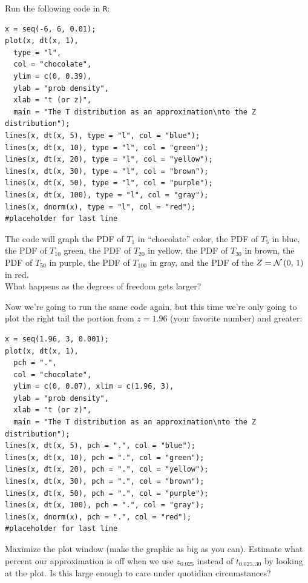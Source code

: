 \documentclass[12pt]{article}
\begin{document}
\benum
\easysubproblem Run the following code in \texttt{R}:

\footnotesize
\begin{verbatim}
x = seq(-6, 6, 0.01);
plot(x, dt(x, 1), 
  type = "l", 
  col = "chocolate", 
  ylim = c(0, 0.39), 
  ylab = "prob density", 
  xlab = "t (or z)", 
  main = "The T distribution as an approximation\nto the Z distribution");
lines(x, dt(x, 5), type = "l", col = "blue");
lines(x, dt(x, 10), type = "l", col = "green");
lines(x, dt(x, 20), type = "l", col = "yellow");
lines(x, dt(x, 30), type = "l", col = "brown");
lines(x, dt(x, 50), type = "l", col = "purple");
lines(x, dt(x, 100), type = "l", col = "gray");
lines(x, dnorm(x), type = "l", col = "red");
#placeholder for last line
\end{verbatim}
\normalsize

The code will graph the PDF of $T_1$ in ``chocolate'' color, the PDF of $T_5$ in blue, the PDF of $T_{10}$ green, the PDF of $T_{20}$ in yellow, the PDF of $T_{30}$ in brown, the PDF of $T_{50}$ in purple, the PDF of $T_{100}$ in gray, and the PDF of the $Z = \mathcal{N}\left(0,\,1\right)$ in red. \\

What happens as the degrees of freedom gets larger?

\intermediatesubproblem Now we're going to run the same code again, but this time we're only going to plot the right tail \ie the portion from $z=1.96$ (your favorite number) and greater:

\footnotesize
\begin{verbatim}
x = seq(1.96, 3, 0.001);
plot(x, dt(x, 1), 
  pch = ".", 
  col = "chocolate", 
  ylim = c(0, 0.07), xlim = c(1.96, 3),
  ylab = "prob density", 
  xlab = "t (or z)", 
  main = "The T distribution as an approximation\nto the Z distribution");
lines(x, dt(x, 5), pch = ".", col = "blue");
lines(x, dt(x, 10), pch = ".", col = "green");
lines(x, dt(x, 20), pch = ".", col = "yellow");
lines(x, dt(x, 30), pch = ".", col = "brown");
lines(x, dt(x, 50), pch = ".", col = "purple");
lines(x, dt(x, 100), pch = ".", col = "gray");
lines(x, dnorm(x), pch = ".", col = "red");
#placeholder for last line
\end{verbatim}
\normalsize

Maximize the plot window (make the graphic as big as you can). Estimate what percent our approximation is off when we use $z_{0.025}$ instead of $t_{0.025, 30}$ by looking at the plot. Is this large enough to care under quotidian circumstances? 
\end{document}

